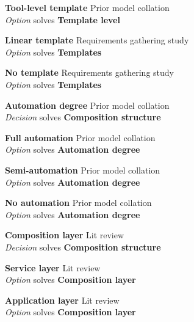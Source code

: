 \textbf{Tool-level template} \hfill Prior model collation \cite{Pietschmann2010} \\ \emph{Option} \hfill solves \textbf{Template level}

\textbf{Linear template} \hfill Requirements gathering study \\ \emph{Option} \hfill solves \textbf{Templates}

\textbf{No template} \hfill Requirements gathering study \\ \emph{Option} \hfill solves \textbf{Templates}

\textbf{Automation degree} \hfill Prior model collation \cite{Aghaee2012} \\ \emph{Decision} \hfill solves \textbf{Composition structure}


\textbf{Full automation} \hfill Prior model collation \cite{Aghaee2012,Fischer2009} \\ \emph{Option} \hfill solves \textbf{Automation degree}

\textbf{Semi-automation} \hfill Prior model collation \cite{Aghaee2012,Fischer2009} \\ \emph{Option} \hfill solves \textbf{Automation degree}

\textbf{No automation} \hfill Prior model collation \cite{Fischer2009} \\ \emph{Option} \hfill solves \textbf{Automation degree}

\textbf{Composition layer} \hfill Lit review \cite{Paterno2011} \\ \emph{Decision} \hfill solves \textbf{Composition structure}

\textbf{Service layer} \hfill Lit review \cite{Paterno2011} \\ \emph{Option} \hfill solves \textbf{Composition layer}

\textbf{Application layer} \hfill Lit review \cite{Paterno2011} \\ \emph{Option} \hfill solves \textbf{Composition layer}

